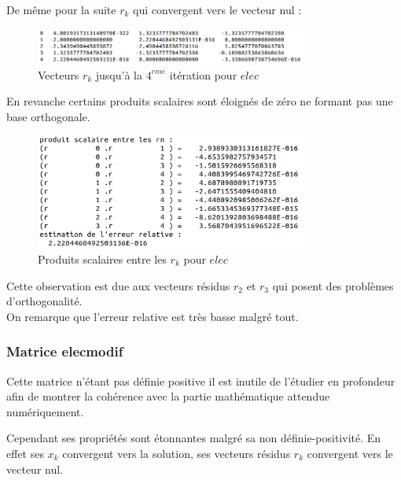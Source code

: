 \documentclass[12,french]{report}
\begin{document}
De même pour la suite $r_{k}$ qui convergent vers le vecteur nul :

\begin{figure}[htb!]
	\centering
	\includegraphics[width=0.8\textwidth]{./Images/r_elec}
	\caption{Vecteurs $r_{k}$ jusqu'à la $4^{eme}$ itération pour $elec$}
\end{figure}\vspace{0.2cm}

En revanche certains produits scalaires sont éloignés de zéro ne formant pas une base orthogonale. 

\begin{figure}[htb!]
	\centering
	\includegraphics[width=0.8\textwidth]{./Images/ps_elec}
	\caption{Produits scalaires entre les $r_{k}$ pour $elec$}
\end{figure}\vspace{0.2cm}

Cette observation est due aux vecteurs résidus $r_{2}$ et $r_{3}$ qui posent des problèmes d'orthogonalité.\\

On remarque que l'erreur relative est très basse malgré tout.

\subsubsection{Matrice elecmodif}

Cette matrice n'étant pas définie positive il est inutile de l'étudier en profondeur afin de montrer la cohérence avec la partie mathématique attendue numériquement.

Cependant ses propriétés sont étonnantes malgré sa non définie-positivité. En effet ses $x_{k}$ convergent vers la solution, ses vecteurs résidus $r_{k}$ convergent vers le vecteur nul.\\
\end{document}
